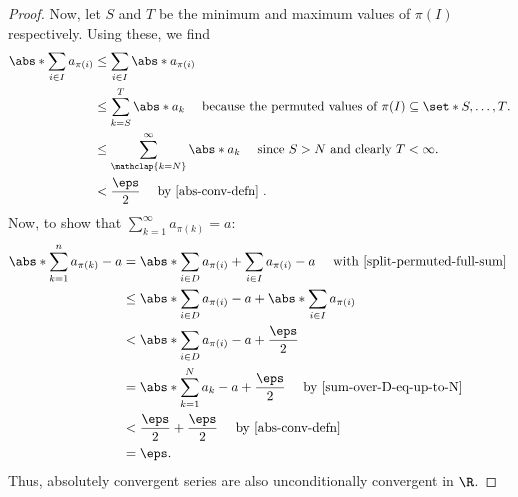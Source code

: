 \documentclass{article}
\begin{document}
\begin{enumerate}
\begin{proof}
          Now, let $S$ and $T$ be the minimum and maximum values of $\pi(I)$ respectively.
          Using these, we find
          \begin{align*}
            \abs*{\sum_{i \in I}a_{\pi(i)}} &\le \sum_{i \in I}\abs*{a_{\pi(i)}}\\
            &\le \sum_{k = S}^{T}\abs*{a_{k}}\quad \textrm{ because the permuted values of } \pi(I) \subseteq \set*{S, \ldots, T}.\\
            &\le \sum_{\mathclap{ k = N }}^{\infty}\abs*{a_{k}} \quad \textrm{ since } S > N \textrm{ and clearly } T < \infty.\\
            &< \frac{\eps}{2} \quad \textrm { by~\eqref{abs-conv-defn} }.
          \end{align*}
          Now, to show that $\sum_{k = 1}^{\infty}a_{\pi(k)} = a$:
          \begin{align*}
            \abs*{\sum_{k = 1}^{n}a_{\pi(k)} - a}
            &= \abs*{\sum_{i \in D}a_{\pi(i)} + \sum_{i \in I}a_{\pi(i)} - a} \quad \textrm{ with~\eqref{split-permuted-full-sum} }\\
            &\le \abs*{\sum_{i \in D}a_{\pi(i)} - a} + \abs*{\sum_{i \in I}a_{\pi(i)}}\\
            &< \abs*{\sum_{i \in D}a_{\pi(i)} - a} + \frac{\eps}{2}\\
            &=\abs*{\sum_{k = 1}^{N}a_{k} - a} + \frac{\eps}{2} \quad \textrm{ by~\eqref{sum-over-D-eq-up-to-N} }\\
            &< \frac{\eps}{2} + \frac{\eps}{2} \quad \textrm{ by~\eqref{abs-conv-defn} }\\
            &= \eps.
          \end{align*}
          Thus, absolutely convergent series are also unconditionally convergent in $\R$.
        \end{proof}
\end{enumerate}
\end{document}
